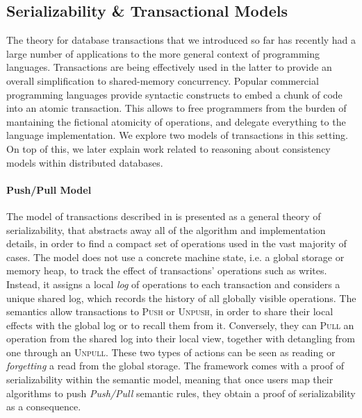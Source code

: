 \tocless\subsection{Serializability \& Transactional Models}

\label{sec:serTransMod}

The theory for database transactions that we introduced so far has recently had a large number of applications to the more general context of programming languages. Transactions are being effectively used in the latter to provide an overall simplification to shared-memory concurrency. Popular commercial programming languages provide syntactic constructs to embed a chunk of code into an atomic transaction. This allows to free programmers from the burden of mantaining the fictional atomicity of operations, and delegate everything to the language implementation. We explore two models of transactions in this setting. On top of this, we later explain work related to reasoning about consistency models within distributed databases. \\

\paragraph{Push/Pull Model}
The model of transactions described in \cite{pushPull} is presented as a general theory of serializability, that abstracts away all of the algorithm and implementation details, in order to find a compact set of operations used in the vast majority of cases. The model does not use a concrete machine state, i.e. a global storage or memory heap, to track the effect of transactions' operations such as writes. Instead, it assigns a local \textit{log} of operations to each transaction and considers a unique shared log, which records the history of all globally visible operations. The semantics allow transactions to \textsc{Push} or \textsc{Unpush}, in order to share their local effects with the global log or to recall them from it. Conversely, they can \textsc{Pull} an operation from the shared log into their local view, together with detangling from one through an \textsc{Unpull}. These two types of actions can be seen as reading or \textit{forgetting} a read from the global storage. The framework comes with a proof of serializability within the semantic model, meaning that once users map their algorithms to push \textit{Push/Pull} semantic rules, they obtain a proof of serializability as a consequence.

